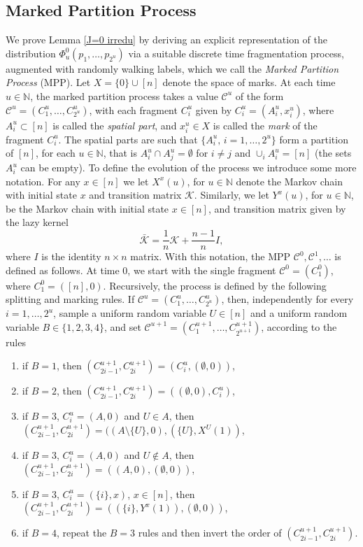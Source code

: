 \documentclass[11pt,reqno]{amsart}
\numberwithin{equation}{section}
\numberwithin{figure}{section}
\newcommand{\1}{\mathds{1}}
\newcommand{\cC}{\ensuremath{\mathcal C}}
\newcommand{\bbN}{{\ensuremath{\mathbb N}} }
\begin{document}
\subsection{Marked Partition Process}
We prove Lemma \ref{J=0 irredu} by deriving an explicit representation of the distribution $\Phi^0_u(p_1,\dots,p_{2^u})$ via a suitable discrete time fragmentation process, augmented with randomly walking labels, which we call the {\em Marked Partition Process} (MPP). Let $X=\{0\}\cup[n]$ denote the space of marks. At each time $u\in\bbN$, the marked partition process takes a value $\cC^u$ of the form 
$\cC^u=(C_1^u,\dots,C_{2^u}^u)$, with each fragment $C_i^u$  given by $C_i^u=(A^u_i,x^u_i)$, where $A^u_i\subset [n]$ is called the {\em spatial part}, and $x^u_i\in X$ is called the {\em mark} of the fragment $C_i^u$. The spatial parts are such that $\{A^u_i,\,i=1,\dots,2^u\}$ form a partition of $[n]$, for each $u\in\bbN$, that is $A^u_i\cap A^u_j=\emptyset $ for $i\neq j$ and $\cup_i A^u_i=[n]$ (the sets $A^u_i$ can be empty). 
To define the evolution of the process we introduce some more notation.  For any $x\in[n]$ we let \(X^x(u)\), for \(u \in \mathbb{N}\) denote the Markov chain with initial state \(x\) and transition matrix \(\mathcal{K}\). Similarly, we let \(Y^x(u)\), for \(u \in \mathbb{N}\), be the Markov chain with initial state $x \in [n]$, and transition matrix given by the lazy kernel
\[
\bar{\mathcal{K}} = \frac{1}{n}\mathcal{K} + \frac{n-1}{n} I,
\]
where \(I\) is the identity $n\times n$ matrix. With this notation, the MPP $\cC^0,\cC^1,\dots$ is defined as follows. 
At time $0$, we start with the single fragment $\cC^0=(C_1^0)$, where $C_1^0=([n],0)$. Recursively,  the process is defined by the following splitting and marking rules.
If $\cC^u=(C_1^u,\dots,C_{2^u}^u)$, %
then, independently for every $i=1,\dots,2^u$, sample a uniform random variable $U\in[n]$ and a uniform random variable $B\in\{1,2,3,4\}$, and set $
\cC^{u+1}=(C_1^{u+1},\dots,C_{2^{u+1}}^{u+1})
$, according to the rules
\begin{enumerate}
\item if $B=1$, then $(C_{2i-1}^{u+1},C_{2i}^{u+1})=(C_i^{u},(\emptyset,0))$, 
\item if $B=2$, then $(C_{2i-1}^{u+1},C_{2i}^{u+1})=((\emptyset,0),C_{i}^{u})$,
\item if $B=3$, $C_i^{u}=(A,0)$ and $U\in A$, then $(C_{2i-1}^{u+1},C_{2i}^{u+1})=((A\setminus\{U\},0),(\{U\},X^U(1))$,
\item if $B=3$, $C_i^{u}=(A,0)$ and $U\notin A$, then $(C_{2i-1}^{u+1},C_{2i}^{u+1})=((A,0),(\emptyset,0))$,
\item if $B=3$, $C_i^{u}=(\{i\},x)$, $x\in[n]$, then $(C_{2i-1}^{u+1},C_{2i}^{u+1})=((\{i\},Y^x(1)),(\emptyset,0))$,
\item if $B=4$, repeat the $B=3$ rules and then invert the order of $(C_{2i-1}^{u+1},C_{2i}^{u+1})$.

\end{enumerate}
\end{document}
